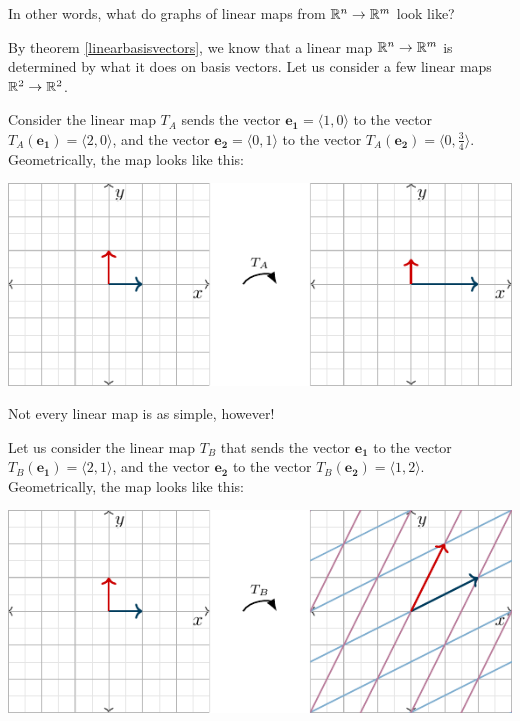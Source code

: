 In other words, what do graphs of linear maps from $\mathbb{R}^n \to \mathbb{R}^m$ look like?

By theorem \ref{linearbasisvectors}, we know that a linear map $\mathbb{R}^n \to \mathbb{R}^m$ is determined by what it does on basis vectors.  Let us consider a few linear maps $\mathbb{R}^2 \to \mathbb{R}^2$.

\begin{example}
    Consider the linear map $T_A$ sends the vector $\bm{e_1} = \langle 1, 0 \rangle$ to the vector $T_A(\bm{e_1}) =  \langle 2, 0 \rangle$, and the vector $\bm{e_2} = \langle 0, 1 \rangle$ to the vector $T_A(\bm{e_2}) = \langle 0, \frac{3}{4} \rangle$. Geometrically, the map looks like this:
    
 \begin{center}        
        \includegraphics{chapters/1-LinearAlgebra/figures/figures-lineartransform1.pdf}
    \end{center}
    
\end{example}

Not every linear map is as simple, however!  

\begin{example}
Let us consider the linear map $T_B$ that sends the vector $\bm{e_1}$ to the vector $T_B(\bm{e_1}) =  \langle 2, 1 \rangle$, and the vector $\bm{e_2}$ to the vector $T_B(\bm{e_2}) = \langle 1, 2 \rangle$.   Geometrically, the map looks like this:
    

 \begin{center}        
        \includegraphics{chapters/1-LinearAlgebra/figures/figures-lineartransform2.pdf}
    \end{center}
    
    \end{example}
    
